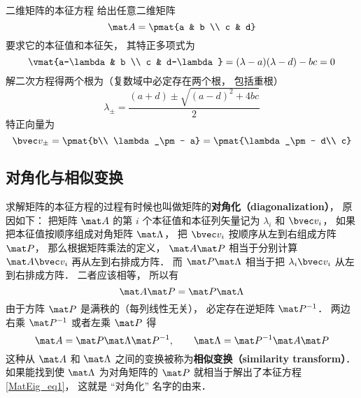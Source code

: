 \begin{example}{二维矩阵的本征方程}
给出任意二维矩阵
\begin{equation}
\mat A = \pmat{a & b \\ c & d}
\end{equation}
要求它的本征值和本征矢， 其特正多项式为
\begin{equation}
\vmat{a-\lambda & b \\ c & d-\lambda} = (\lambda-a)(\lambda-d) - bc = 0
\end{equation}
解二次方程得两个根为（复数域中必定存在两个根， 包括重根）
\begin{equation}
\lambda_\pm = \frac{(a + d) \pm \sqrt{(a-d)^2 + 4bc}}{2}
\end{equation}
特正向量为
\begin{equation}
\bvec v_\pm = \pmat{b\\ \lambda_\pm - a} = \pmat{\lambda_\pm - d\\ c}
\end{equation}
\end{example}

\subsection{对角化与相似变换}
求解矩阵的本征方程的过程有时候也叫做矩阵的\textbf{对角化（diagonalization）}， 原因如下： 把矩阵 $\mat A$ 的第 $i$ 个本征值和本征列矢量记为 $\lambda_i$ 和 $\bvec v_i$， 如果把本征值按顺序组成对角矩阵 $\mat \Lambda$， 把 $\bvec v_i$ 按顺序从左到右组成方阵 $\mat P$， 那么根据矩阵乘法的定义， $\mat A \mat P$ 相当于分别计算 $\mat A\bvec v_i$ 再从左到右排成方阵． 而 $\mat P\mat\Lambda$ 相当于把 $\lambda_i\bvec v_i$ 从左到右排成方阵． 二者应该相等， 所以有
\begin{equation}
\mat A \mat P = \mat P\mat\Lambda
\end{equation}
由于方阵 $\mat P$ 是满秩的（每列线性无关）， 必定存在逆矩阵%
$\mat P^{-1}$． 两边右乘 $\mat P^{-1}$ 或者左乘 $\mat P$ 得
\begin{equation}\label{MatEig_eq3}
\mat A = \mat P\mat\Lambda\mat P^{-1}, \qquad
\mat \Lambda = \mat P^{-1}\mat A \mat P
\end{equation}
这种从 $\mat A$ 和 $\mat\Lambda$ 之间的变换被称为\textbf{相似变换（similarity transform）}． 如果能找到使 $\mat\Lambda$ 为对角矩阵的 $\mat P$ 就相当于解出了本征方程\autoref{MatEig_eq1}， 这就是 “对角化” 名字的由来．
